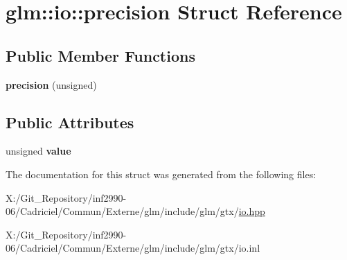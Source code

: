 \hypertarget{structglm_1_1io_1_1precision}{\section{glm\-:\-:io\-:\-:precision Struct Reference}
\label{structglm_1_1io_1_1precision}
}
\subsection*{Public Member Functions}
\begin{DoxyCompactItemize}
\item 
\hypertarget{structglm_1_1io_1_1precision_aa359e1766fd74b88e049d5449d521447}{{\bfseries precision} (unsigned)}\label{structglm_1_1io_1_1precision_aa359e1766fd74b88e049d5449d521447}

\end{DoxyCompactItemize}
\subsection*{Public Attributes}
\begin{DoxyCompactItemize}
\item 
\hypertarget{structglm_1_1io_1_1precision_a43da772dff9a209768c63f1220d52074}{unsigned {\bfseries value}}\label{structglm_1_1io_1_1precision_a43da772dff9a209768c63f1220d52074}

\end{DoxyCompactItemize}


The documentation for this struct was generated from the following files\-:\begin{DoxyCompactItemize}
\item 
X\-:/\-Git\-\_\-\-Repository/inf2990-\/06/\-Cadriciel/\-Commun/\-Externe/glm/include/glm/gtx/\hyperlink{io_8hpp}{io.\-hpp}\item 
X\-:/\-Git\-\_\-\-Repository/inf2990-\/06/\-Cadriciel/\-Commun/\-Externe/glm/include/glm/gtx/io.\-inl\end{DoxyCompactItemize}
